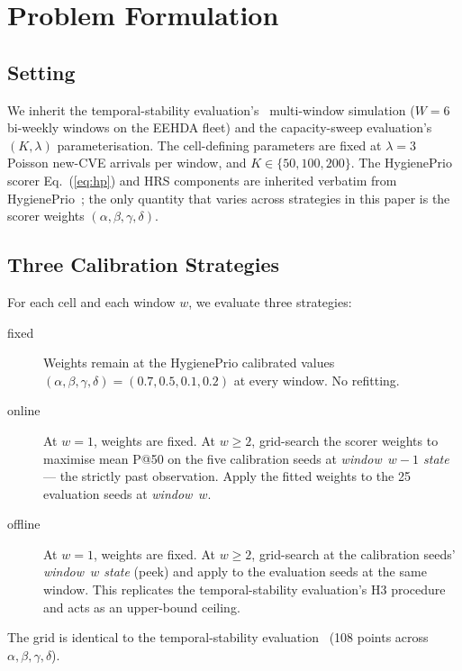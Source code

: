 \section{Problem Formulation}
\label{sec:problem}

\subsection{Setting}

We inherit the temporal-stability evaluation's~\cite{paper5temporal} multi-window simulation
($W = 6$ bi-weekly windows on the EEHDA fleet) and the capacity-sweep evaluation's~\cite{paper6capacity}
$(K, \lambda)$ parameterisation. The cell-defining parameters are
fixed at $\lambda = 3$ Poisson new-CVE arrivals per window, and
$K \in \{50, 100, 200\}$. The HygienePrio scorer Eq.~(\ref{eq:hp}) and
HRS components are inherited verbatim from HygienePrio~\cite{paper4hygieneprio};
the only quantity that varies across strategies in this paper is the
scorer weights $(\alpha, \beta, \gamma, \delta)$.

\subsection{Three Calibration Strategies}

For each cell and each window $w$, we evaluate three strategies:

\begin{description}
\item[\textsf{fixed}] Weights remain at the HygienePrio calibrated values
$(\alpha, \beta, \gamma, \delta) = (0.7, 0.5, 0.1, 0.2)$ at every
window. No refitting.
\item[\textsf{online}] At $w = 1$, weights are \textsf{fixed}.
At $w \geq 2$, grid-search the scorer weights to maximise mean P@50 on
the five calibration seeds at \textit{window~$w-1$ state} --- the
strictly past observation. Apply the fitted weights to the 25
evaluation seeds at \textit{window~$w$}.
\item[\textsf{offline}] At $w = 1$, weights are \textsf{fixed}.
At $w \geq 2$, grid-search at the calibration seeds' \textit{window~$w$
state} (peek) and apply to the evaluation seeds at the same window. This
replicates the temporal-stability evaluation's H3 procedure and acts as an upper-bound ceiling.
\end{description}

The grid is identical to the temporal-stability evaluation~\cite{paper5temporal} (108 points across
$\alpha, \beta, \gamma, \delta$).

